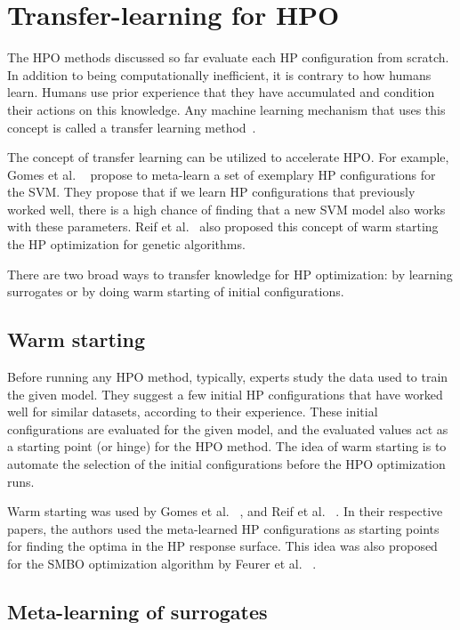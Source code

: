 \documentclass[12pt, twoside, ngerman]{report}
\begin{document}
\section{Transfer-learning for HPO}

The HPO methods discussed so far evaluate each HP configuration from scratch.
In addition to being computationally inefficient,  it is contrary to how humans learn.
Humans use prior experience that they have accumulated and condition their actions on this knowledge.
Any machine learning mechanism that uses this concept is called a transfer learning method~\cite{Weiss2016}.

The concept of transfer learning can be utilized to accelerate HPO.
For example,  Gomes et al. ~\cite{svmhpmetalearnt} propose to meta-learn a set of exemplary HP configurations for the SVM.
They propose that if we learn HP configurations that previously worked well, there is a high chance of finding that a new SVM model also works with these parameters.
Reif et al.~\cite{metalearningwarmstartpaper} also proposed this concept of warm starting the HP optimization for genetic algorithms.

There are two broad ways to transfer knowledge for HP optimization: by learning surrogates or by doing warm starting of initial configurations.

\subsection{Warm starting}

Before running any HPO method, typically, experts study the data used to train the given model.
They suggest a few initial HP configurations that have worked well for similar datasets, according to their experience.
These initial configurations are evaluated for the given model, and the evaluated values act as a starting point (or hinge) for the HPO method.
The idea of warm starting is to automate the selection of the initial configurations before the HPO optimization runs.

Warm starting was used by Gomes et al. ~\cite{svmhpmetalearnt}, and Reif et al. ~\cite{metalearningwarmstartpaper}. In their respective papers, the authors used the meta-learned HP configurations as starting points for finding the optima in the HP response surface.
This idea was also proposed for the SMBO optimization algorithm by Feurer et al. ~\cite{Feurer2014UsingMT}.


\subsection{Meta-learning of surrogates}
\end{document}
